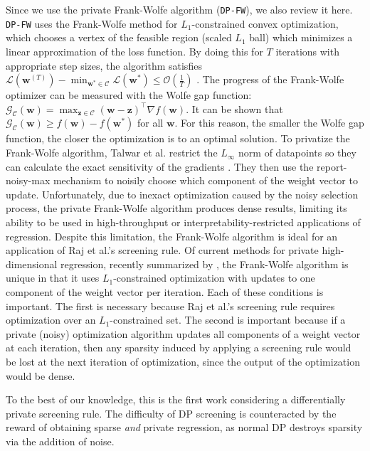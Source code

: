 Since we use the private Frank-Wolfe algorithm (\texttt{DP-FW}), we also review it here. \texttt{DP-FW} uses the Frank-Wolfe method for $L_1$-constrained convex optimization, which chooses a vertex of the feasible region (scaled $L_1$ ball) which minimizes a linear approximation of the loss function. By doing this for $T$ iterations with appropriate step sizes, the algorithm satisfies $\mathcal{L}(\mathbf{w}^{(T)}) - \min_{\mathbf{w}^*  \in \mathcal{C}} \mathcal{L}(\mathbf{w}^*) \leq \mathcal{O}(\frac{1}{T})$ \cite{frank1956algorithm,jaggi2013revisiting}. The progress of the Frank-Wolfe optimizer can be measured with the Wolfe gap function: $\mathcal{G}_{\mathcal{C}}(\mathbf{w}) = \max_{\mathbf{z} \in \mathcal{C}} (\mathbf{w} - \mathbf{z})^{\top}\nabla f(\mathbf{w})$. It can be shown that $\mathcal{G}_{\mathcal{C}}(\mathbf{w}) \geq f(\mathbf{w}) - f(\mathbf{w}^*)$ for all $\mathbf{w}$. For this reason, the smaller the Wolfe gap function, the closer the optimization is to an optimal solution. To privatize the Frank-Wolfe algorithm, Talwar et al. restrict the $L_\infty$ norm of datapoints so they can calculate the exact sensitivity of the gradients \cite{talwar2015nearly}. They then use the report-noisy-max mechanism to noisily choose which component of the weight vector to update. Unfortunately, due to inexact optimization caused by the noisy selection process, the private Frank-Wolfe algorithm produces dense results, limiting its ability to be used in high-throughput or interpretability-restricted applications of regression. Despite this limitation, the Frank-Wolfe algorithm is ideal for an application of Raj et al.'s screening rule. Of current methods for private high-dimensional regression, recently summarized by \cite{khanna2024sok}, the Frank-Wolfe algorithm is unique in that it uses $L_1$-constrained optimization with updates to one component of the weight vector per iteration. Each of these conditions is important. The first is necessary because Raj et al.'s screening rule requires optimization over an $L_1$-constrained set. The second is important because if a private (noisy) optimization algorithm updates all components of a weight vector at each iteration, then any sparsity induced by applying a screening rule would be lost at the next iteration of optimization, since the output of the optimization would be dense.

To the best of our knowledge, this is the first work considering a differentially private screening rule. The difficulty of DP screening is counteracted by the reward of obtaining sparse \textit{and} private regression, as normal DP destroys sparsity via the addition of noise.
